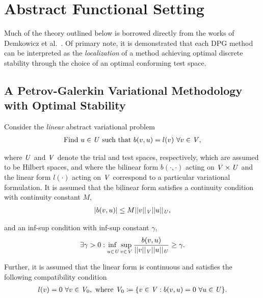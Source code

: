 \section{Abstract Functional Setting}

Much of the theory outlined below is borrowed directly from the works of Demkowicz et
al.~\cite{Demkowicz2014_overview,Demkowicz2017}. Of primary note, it is demonstrated that each DPG method can be
interpreted as the \emph{localization} of a method achieving optimal discrete stability through the choice of an
optimal conforming test space.

\subsection{A Petrov-Galerkin Variational Methodology with Optimal Stability} \label{sec:PG_aspect_of_DPG}

Consider the \emph{linear} abstract variational problem
\begin{align} \label{eq:bilinear_abstract_infinite}
\text{Find}\ u \in \mathit{{{U}}}\ \text{such that}\
b(v,u) = l(v)\ \forall v \in \mathit{{{V}}},
\end{align}

where $\mathit{{{U}}}$ and $\mathit{{{V}}}$ denote the trial and test spaces, respectively, which are assumed to be Hilbert
spaces, and where the bilinear form $b(\cdot,\cdot)$ acting on $\mathit{{{V}}} \times \mathit{{{U}}}$ and the linear form
$l(\cdot)$ acting on $\mathit{{{V}}}$ correspond to a particular variational formulation. It is assumed that the bilinear form
satisfies a continuity condition with continuity constant $M$,
\begin{align}
| b(v,u) | \le M
||v||_{\mathit{{{V}}}}
||u||_{\mathit{{{U}}}},
\end{align}

and an inf-sup condition with inf-sup constant $\gamma$,
\begin{align} \label{eq:inf_sup_infinite}
\exists \gamma > 0 :
\adjustlimits\inf_{u\in\fspace{U}} \sup_{v\in\fspace{V}}
\frac{b(v,u)}{||v||_{\fspace{V}}||u||_{\fspace{U}}} \ge \gamma.
\end{align}

Further, it is assumed that the linear form is continuous and satisfies the following compatibility condition
\begin{align}
l(v) = 0\ \forall v \in \mathit{{{V}}}_0,\ \text{where}\ \mathit{{{V}}}_0 \coloneqq \{v \in \mathit{{{V}}} : b(v,u) = 0\ \forall u
\in \mathit{{{U}}} \}.
\end{align}

